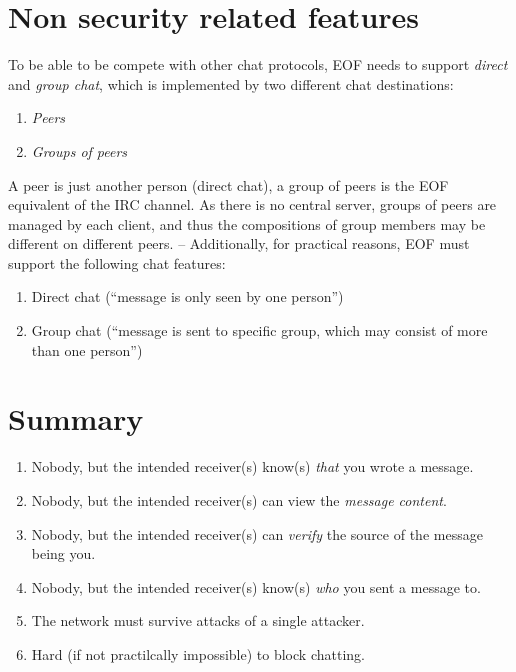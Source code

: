 \section{Non security related features}
To be able to be compete with other chat protocols, EOF needs
to support \emph{direct} and \emph{group chat}, which is
implemented by two different chat destinations:
\begin{enumerate}
\item \emph{Peers}
\item \emph{Groups of peers}
\end{enumerate}
A peer is just another person (direct chat), a group of peers is the EOF
equivalent of the IRC channel\cite{irc-1}. As there is no central server,
groups of peers are managed by each client, and thus the compositions of
group members may be different on different peers.
-- 
Additionally, for practical reasons, EOF must support the following
chat features:
\begin{enumerate}
\item Direct chat ("`message is only seen by one person"')
\item Group chat ("`message is sent to specific group, which may consist of
more than one person"')
\end{enumerate}

\section{Summary}
\begin{enumerate}
\item Nobody, but the intended receiver(s) know(s) \emph{that} you wrote a message.
\item Nobody, but the intended receiver(s) can view the \emph{message content}.
\item Nobody, but the intended receiver(s) can \emph{verify} the source of the message being you.
\item Nobody, but the intended receiver(s) know(s) \emph{who} you sent a message to.
\item The network must survive attacks of a single attacker.
\item Hard (if not practilcally impossible) to block chatting.
\end{enumerate}


